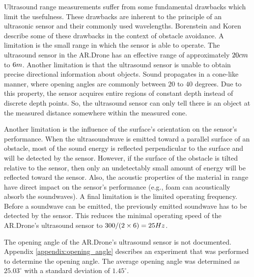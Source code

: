 Ultrasound range measurements suffer from some fundamental drawbacks which limit the usefulness.
These drawbacks are inherent to the principle of an ultrasonic sensor and their commonly used wavelengths.
Borenstein and Koren \cite{borenstein1988obstacle} describe some of these drawbacks in the context of obstacle avoidance.
A limitation is the small range in which the sensor is able to operate.
The ultrasound sensor in the AR.Drone has an effective range of approximately $20\small{cm}$ to $6\small{m}$.
Another limitation is that the ultrasound sensor is unable to obtain precise directional information about objects.
Sound propagates in a cone-like manner, where opening angles are commonly between $20$ to $40$ degrees.
Due to this property, the sensor acquires entire regions of constant depth instead of discrete depth points.
So, the ultrasound sensor can only tell there is an object at the measured distance somewhere within the measured cone.

Another limitation is the influence of the surface's orientation on the sensor's performance.
When the ultrasoundwave is emitted toward a parallel surface of an obstacle, most of the sound energy is reflected perpendicular to the surface and will be detected by the sensor.
However, if the surface of the obstacle is tilted relative to the sensor, then only an undetectably small amount of energy will be reflected toward the sensor.
Also, the acoustic properties of the material in range have direct impact on the sensor's performance (e.g., foam can acoustically absorb the soundwaves).
A final limitation is the limited operating frequency.
Before a soundwave can be emitted, the previously emitted soundwave has to be detected by the sensor.
This reduces the minimal operating speed of the AR.Drone's ultrasound sensor to $300 / (2 \times 6) = 25\small{Hz}$.

The opening angle of the AR.Drone's ultrasound sensor is not documented.
Appendix \ref{appendix:opening_angle} describes an experiment that was performed to determine the opening angle.
The average opening angle was determined as $25.03^{\circ}$ with a standard deviation of $1.45^{\circ}$.

